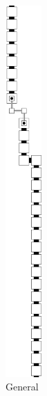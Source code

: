 \begin{itemize}
        \begin{figure}[H]
            \centering
            \begin{subfigure}[t]{0.24\textwidth}
                \centering
                \includegraphics[width=0.15\textwidth]{warping/pre_warp_general}
                \caption{\label{fig:pre_warp_general} General }
            \end{subfigure}%
            ~
            \begin{subfigure}[t]{0.24\textwidth}
                \centering

\end{subfigure}
\end{figure}
\end{itemize}
